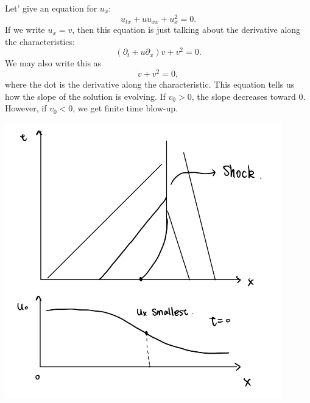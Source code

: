 \begin{example}
    Let' give an equation for $u_x$: 
    \[
        u_{tx}+uu_{xx} + u^2_x =0.
    \]
    If we write $u_x=v$, then this equation is just talking about the derivative along the characteristics: 
    \[
        (\partial_t + u \partial_x)v + v^2 = 0.
    \]
    We may also write this as
    \[
        \dot v + v^2 = 0,
    \]
    where the dot is the derivative along the characteristic. This equation tells us how the slope of the solution is evolving. If $v_0>0$, the slope decreases toward $0$. However, if $v_0<0$, we get finite time blow-up.
    
    \vspace{1em}
        \begin{minipage}{0.45\textwidth}
    \end{minipage}
    \begin{minipage}{ 0.45\textwidth}
        \centering
        \includegraphics[width=0.9\textwidth]{pics/6-1.png}
    \end{minipage}
    \vspace{1em}


\end{example}
